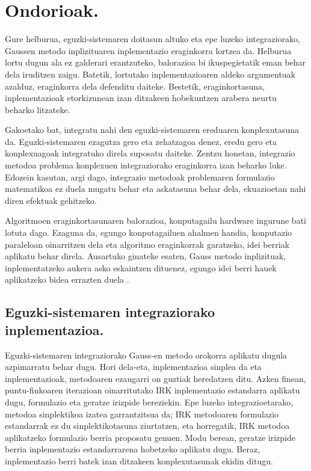 \chapter{Ondorioak.}


Gure helburua, eguzki-sistemaren doitasun altuko eta epe luzeko integraziorako, Gaussen metodo inplizituaren inplementazio eraginkorra lortzea da. Helburua lortu dugun ala ez galderari erantzuteko, balorazioa bi ikuspegietatik eman behar dela iruditzen zaigu. Batetik, lortutako inplementazioaren aldeko argumentuak azalduz, eraginkorra dela defenditu daiteke. Bestetik, eraginkortasuna,  inplementazioak etorkizunean izan ditzakeen hobekuntzen arabera neurtu beharko litzateke. 

Gakoetako bat, integratu nahi den eguzki-sistemaren ereduaren konplexutasuna da. Eguzki-sistemaren ezagutza gero eta zehatzagoa denez, eredu gero eta konplexuagoak integratuko direla suposatu daiteke. Zentzu honetan, integrazio metodoa problema konplexuen integraziorako eraginkorra izan beharko luke. Edozein kasutan, argi dago, integrazio metodoak  problemaren formulazio matematikoa ez duela mugatu behar eta askatasuna behar dela, ekuazioetan nahi diren efektuak gehitzeko.   

Algoritmoen eraginkortasunaren balorazioa, konputagailu hardware ingurune bati lotuta dago. Ezaguna da, egungo konputagailuen ahalmen handia, konputazio paraleloan oinarritzen dela eta algoritmo eraginkorrak garatzeko, idei berriak aplikatu behar direla. Ausartuko ginateke esaten, Gauss metodo inplizituak, inplementatzeko aukera asko eskaintzen dituenez, egungo idei berri hauek aplikatzeko bidea errazten duela \cite{Dongarra2017}.   


\section*{Eguzki-sistemaren integraziorako inplementazioa.}


Eguzki-sistemaren integraziorako Gauss-en metodo orokorra aplikatu dugula azpimarratu behar dugu. Hori dela-eta, inplementazioa sinplea da eta inplementazioak, metodoaren ezaugarri on guztiak heredatzen ditu. Azken finean, puntu-finkoaren iterazioan oinarritutako IRK inplementazio estandarra aplikatu dugu, formulazio eta geratze irizpide bereziekin. Epe luzeko integrazioetarako, metodoa sinplektikoa izatea garrantzitsua da; IRK metodoaren formulazio estandarrak ez du sinplektikotasuna ziurtatzen, eta horregatik, IRK metodoa aplikatzeko formulazio berria proposatu genuen. Modu berean, geratze irizpide berria inplementazio estandarrarena hobetzeko aplikatu dugu. Beraz, inplementazio berri batek izan ditzakeen konplexutasunak ekidin ditugu. 

